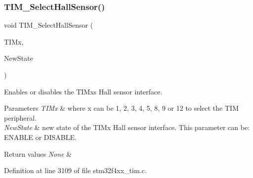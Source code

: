 \subsubsection{\texorpdfstring{T\+I\+M\+\_\+\+Select\+Hall\+Sensor()}{TIM\_SelectHallSensor()}}
{\footnotesize\ttfamily void T\+I\+M\+\_\+\+Select\+Hall\+Sensor (\begin{DoxyParamCaption}\item[{\hyperlink{struct_t_i_m___type_def}{T\+I\+M\+\_\+\+Type\+Def} $\ast$}]{T\+I\+Mx,  }\item[{Functional\+State}]{New\+State }\end{DoxyParamCaption})}



Enables or disables the T\+I\+Mx\textquotesingle{}s Hall sensor interface. 


\begin{DoxyParams}{Parameters}
{\em T\+I\+Mx} & where x can be 1, 2, 3, 4, 5, 8, 9 or 12 to select the T\+IM peripheral. \\
\hline
{\em New\+State} & new state of the T\+I\+Mx Hall sensor interface. This parameter can be\+: E\+N\+A\+B\+LE or D\+I\+S\+A\+B\+LE. \\
\hline
\end{DoxyParams}

\begin{DoxyRetVals}{Return values}
{\em None} & \\
\hline
\end{DoxyRetVals}


Definition at line 3109 of file stm32f4xx\+\_\+tim.\+c.

